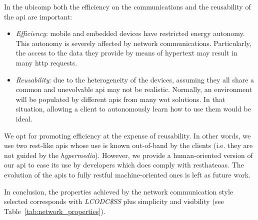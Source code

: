 


In the \ac{ubicomp} both the efficiency on the communications and the reusability of the \ac{api} are important:
\begin{itemize}
  \item \emph{Efficiency}: mobile and embedded devices have restricted energy autonomy.
                    This autonomy is severely affected by network communications. %
                    Particularly, the access to the data they provide by means of hypertext may result in many \ac{http} requests. %
  \item \emph{Reusability}: due to the heterogeneity of the devices, assuming they all share a common and unevolvable \ac{api} may not be realistic.
			    Normally, an environment will be populated by different \acp{api} from many \ac{wot} solutions.
			    In that situation, allowing a client to autonomously learn how to use them would be ideal.
\end{itemize}


We opt for promoting efficiency at the expense of reusability.
In other words, we use two \ac{rest}-like \acp{api} whose use is known out-of-band by the clients (i.e. they are not guided by the \emph{hypermedia}). %
However, we provide a human-oriented version of our \ac{api} to ease its use by developers which does comply with \ac{resthateoas}.%
The evolution of the \acp{api} to fully \ac{rest}ful machine-oriented ones is left as future work. %

\bigskip

In conclusion, the properties achieved by the network communication style selected corresponds with \emph{LCODC\$SS} plus simplicity and visibility (see Table~\ref{tab:network_properties}). %


